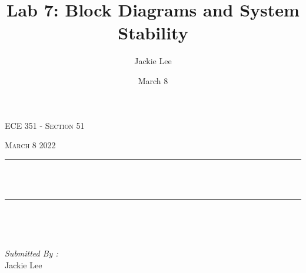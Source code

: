 \documentclass[12pt]{report}
\title{Lab 7: Block Diagrams and System Stability}
\author{ Jackie Lee}
\date{March 8}
\makeatletter
\let\thetitle\@title
\makeatother
\begin{document}

\begin{titlepage}
	\centering
    \vspace*{0.5 cm}
\begin{center}    \textsc{\Large   ECE 351 - Section 51 }\\[2.0 cm]	\end{center}%
	\textsc{\Large March 8 2022  }\\[0.5 cm]				%
	\rule{\linewidth}{0.2 mm} \\[0.4 cm]
	{ \huge \bfseries \thetitle}\\
	\rule{\linewidth}{0.2 mm} \\[1.5 cm]
	
	\begin{minipage}{0.4\textwidth}
		\begin{flushleft} \large
			\end{flushleft}
			\end{minipage}~
			\begin{minipage}{0.4\textwidth}
            
			\begin{flushright} \large
			\emph{Submitted By :} \\
			Jackie Lee  
		\end{flushright}
           
	\end{minipage}\\[2 cm]
	
    
    
    
    
	
\end{titlepage}


\tableofcontents
\pagebreak

\renewcommand{\thesection}{\arabic{section}}
\end{document}
